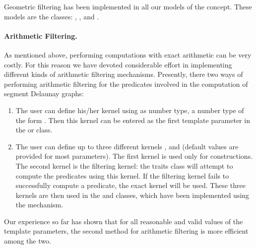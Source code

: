 Geometric filtering has been implemented in all our models of the
 concept. These models are the
classes:
,
,
 and
.



\paragraph{Arithmetic Filtering.}
As mentioned above, performing computations with exact arithmetic
can be very costly. For this reason we have devoted considerable
effort in implementing different kinds of arithmetic filtering
mechanisms. Presently, there two ways of performing arithmetic
filtering for the predicates involved in the computation of
segment Delaunay graphs:
\begin{enumerate}
\item The user can define his/her kernel using as number type, a
  number type of the form . Then this
  kernel can be entered as the first template parameter in the
   or
   class.
\item The user can define up to three different kernels ,
   and  (default values are provided for most
  parameters). The first kernel  is used only for
  constructions. The second kernel  is the filtering kernel:
  the traits class will attempt to compute the predicates using this
  kernel. If the filtering kernel fails to successfully compute a
  predicate, the exact kernel  will be used. These three
  kernels are then used in the 
   and
  classes, which have been implemented using the
   mechanism.
\end{enumerate}
Our experience so far has shown that for all reasonable and valid
values of the template parameters, the second method for arithmetic
filtering is more efficient among the two.

